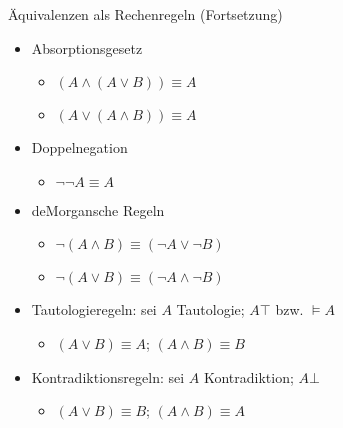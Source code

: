 \begin{frame}{Äquivalenzen als Rechenregeln (Fortsetzung)}
	\begin{itemize}
		\item Absorptionsgesetz
		\begin{itemize}
			\item $(A \land (A \lor B)) \equiv A$
			\item $(A \lor (A \land B)) \equiv A$
		\end{itemize}
		\item Doppelnegation
		\begin{itemize}
			\item $\neg \neg A \equiv A$
		\end{itemize}
		\item deMorgansche Regeln
		\begin{itemize}
			\item $\neg (A \land B) \equiv (\neg A \lor \neg B)$
			\item $\neg (A \lor B) \equiv (\neg A \land \neg B)$
		\end{itemize}
		\item Tautologieregeln: sei $A$ Tautologie; $A\top$ bzw. $\models A$
		\begin{itemize}
			\item $(A \lor B) \equiv A$; $(A \land B) \equiv B$
		\end{itemize}
		\item Kontradiktionsregeln: sei $A$ Kontradiktion; $A\bot$
		\begin{itemize}
			\item $(A \lor B) \equiv B$; $(A \land B) \equiv A$
		\end{itemize}
	\end{itemize}
\end{frame}

